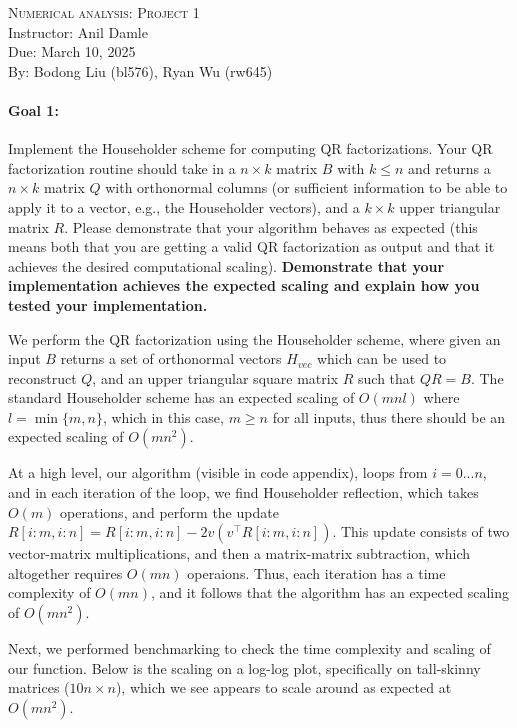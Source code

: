 \documentclass[11pt,onecolumn]{article}
\newcommand{\bluebox}[1]{
  \begin{tcolorbox}[colback=blue!5!white,colframe=blue!75!black,boxrule=0.5pt,boxsep=0pt,left=6pt,right=16pt,top=4pt,bottom=4pt]
  #1
  \end{tcolorbox}   
}
\begin{document}
\noindent
\textsc{\Large Numerical analysis: Project 1}\\
Instructor: Anil Damle\\
Due: March 10, 2025\\

By: Bodong Liu (bl576), Ryan Wu (rw645)
\bluebox{
\paragraph{Goal 1:}
Implement the Householder scheme for computing QR factorizations. Your QR factorization routine should take in a $n \times k$ matrix $B$ with $k\leq n$ and returns a $n\times k$ matrix $Q$ with orthonormal columns (or sufficient information to be able to apply it to a vector, e.g., the Householder vectors), and a $k\times k$ upper triangular matrix $R.$ Please demonstrate that your algorithm behaves as expected (this means both that you are getting a valid QR factorization as output and that it achieves the desired computational scaling). \textbf{Demonstrate that your implementation achieves the expected scaling and explain how you tested your implementation.}}

We perform the QR factorization using the Householder scheme, where given an input $B$ returns a set of orthonormal vectors $H_{vec}$ which can be used to reconstruct $Q$, and an upper triangular square matrix $R$ such that $QR=B$. The standard Householder scheme has an expected scaling of $O(mnl)$ where $l=\min \{m,n\}$, which in this case, $m\geq n$ for all inputs, thus there should be an expected scaling of $O(mn^2)$. 

At a high level, our algorithm (visible in code appendix), loops from $i=0...n$, and in each iteration of the loop, we find Householder reflection, which takes $O(m)$ operations, and perform the update $R[i:m,i:n] = R[i:m,i:n]-2v(v^\top R[i:m,i:n])$. This update consists of two vector-matrix multiplications, and then a matrix-matrix subtraction, which altogether requires $O(mn)$ operaions. Thus, each iteration has a time complexity of $O(mn)$, and it follows that the algorithm has an expected scaling of $O(mn^2)$. 

Next, we performed benchmarking to check the time complexity and scaling of our function. Below is the scaling on a log-log plot, specifically on tall-skinny matrices ($10n\times n$), which we see appears to scale around as expected at $O(mn^2)$.
\end{document}
